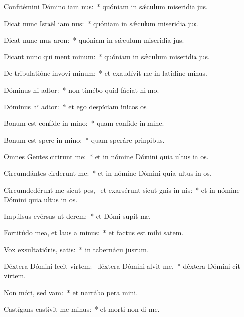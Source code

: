\item Confitémini Dómino iam nus:~* quóniam in sǽculum miseridia jus.
\item Dicat nunc Israël iam nus:~* quóniam in sǽculum miseridia jus.
\item Dicat nunc mus aron:~* quóniam in sǽculum miseridia jus.
\item Dicant nunc qui ment minum:~* quóniam in sǽculum miseridia jus.
\item De tribulatióne invovi minum:~* et exaudívit me in latidine minus.
\item Dóminus hi adtor:~* non timébo quid fáciat hi mo.
\item Dóminus hi adtor:~* et ego despíciam inicos os.
\item Bonum est confíde in mino:~* quam confíde in mine.
\item Bonum est spere in mino:~* quam speráre  prinpibus.
\item Omnes Gentes cirirunt me:~* et in nómine Dómini quia ultus  in os.
\item Circumdántes cirderunt me:~* et in nómine Dómini quia ultus  in os.
\item Circumdedérunt me sicut pes,~\pscross{} et exarsérunt sicut gnis in nis:~* et in nómine Dómini quia ultus  in os.
\item Impúlsus evérsus  ut derem:~* et Dómi supit me.
\item Fortitúdo mea, et laus a minus:~* et factus est mihi  satem.
\item Vox exsultatiónis,  satis:~* in tabernácu jusrum.
\item Déxtera Dómini fecit virtem:~\pscross{} déxtera Dómini alvit me,~* déxtera Dómini cit virtem.
\item Non móri, sed vam:~* et narrábo pera mini.
\item Castígans castivit me minus:~* et morti non di me.
